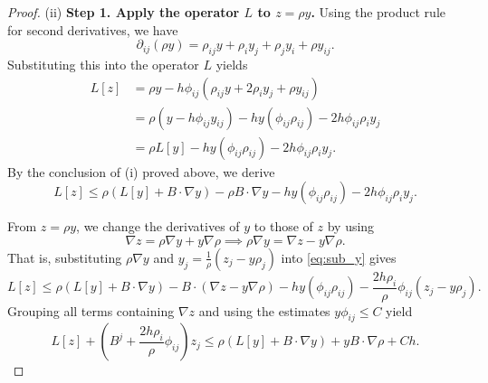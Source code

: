 \documentclass[11pt]{article}
\numberwithin{equation}{section}
\def\le{\leqslant}
\def\leq{\leqslant}
\begin{document}
\begin{proof}
(ii) \textbf{Step 1. Apply the operator $L$ to $z = \rho y$.} Using the product rule for second derivatives, we have
\[ \partial_{ij}(\rho y) = \rho_{ij} y + \rho_i y_j + \rho_j y_i + \rho y_{ij}. \]
Substituting this into the operator $L$ yields
\begin{align*}
L[z] &= \rho y - h \phi_{ij} (\rho_{ij} y + 2 \rho_i y_j + \rho y_{ij}) \\
&= \rho (y - h \phi_{ij} y_{ij}) - h y (\phi_{ij} \rho_{ij}) - 2h \phi_{ij} \rho_i y_j \\
&= \rho L[y] - h y (\phi_{ij} \rho_{ij}) - 2h \phi_{ij} \rho_i y_j.
\end{align*}
By the conclusion of (i) proved above, we derive
\begin{equation}
L[z] \le \rho \left(L[y] + B \cdot \nabla y \right) - \rho B \cdot \nabla y - h y (\phi_{ij} \rho_{ij}) - 2h \phi_{ij} \rho_i y_j. \label{eq:sub_y}
\end{equation}

From $z = \rho y$, we change the derivatives of $y$ to those of $z$ by using
\[ \nabla z = \rho \nabla y + y \nabla \rho \implies \rho \nabla y = \nabla z - y \nabla \rho. \]
That is, substituting $\rho \nabla y$ and $y_j = \frac{1}{\rho}(z_j - y \rho_j)$ into \eqref{eq:sub_y} gives
\[ L[z] \le \rho \left(L[y] + B \cdot \nabla y \right) - B \cdot (\nabla z - y \nabla \rho) - h y (\phi_{ij} \rho_{ij}) - \frac{2h \rho_i}{\rho} \phi_{ij} (z_j - y \rho_j). \]
Grouping all terms containing $\nabla z$ and using the estimates $y\phi_{ij}\leq C$ yield
\begin{equation}\label{eq:Lz}
L[z] + \left(B^j + \frac{2h \rho_i}{\rho} \phi_{ij}\right)z_j \le \rho \left(L[y] + B \cdot \nabla y \right) + yB \cdot \nabla \rho + Ch.
\end{equation}

\medskip


\end{proof}
\end{document}
